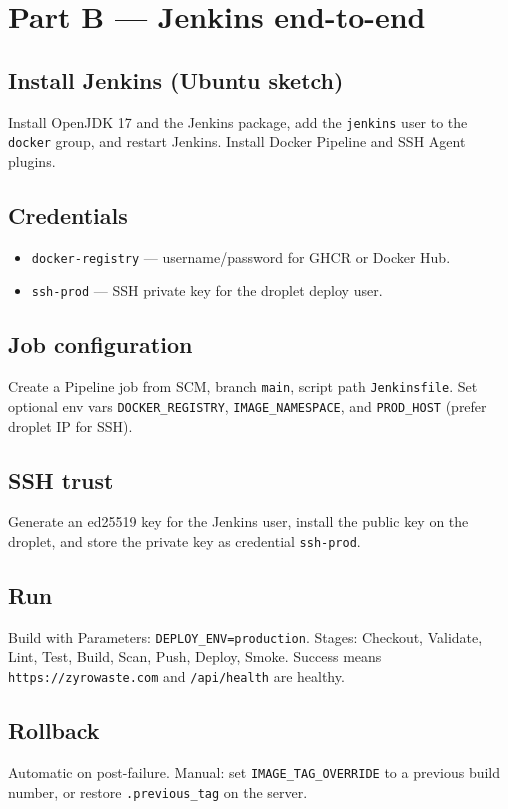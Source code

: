 \documentclass[12pt,a4paper]{article}
\begin{document}
\section{Part B --- Jenkins end-to-end}

\subsection*{Install Jenkins (Ubuntu sketch)}
Install OpenJDK 17 and the Jenkins package, add the \texttt{jenkins} user to the \texttt{docker} group, and restart Jenkins. Install Docker Pipeline and SSH Agent plugins.

\subsection*{Credentials}
\begin{itemize}
  \item \texttt{docker-registry} --- username/password for GHCR or Docker Hub.
  \item \texttt{ssh-prod} --- SSH private key for the droplet deploy user.
\end{itemize}

\subsection*{Job configuration}
Create a Pipeline job from SCM, branch \texttt{main}, script path \texttt{Jenkinsfile}. Set optional env vars \texttt{DOCKER\_REGISTRY}, \texttt{IMAGE\_NAMESPACE}, and \texttt{PROD\_HOST} (prefer droplet IP for SSH).

\subsection*{SSH trust}
Generate an ed25519 key for the Jenkins user, install the public key on the droplet, and store the private key as credential \texttt{ssh-prod}.

\subsection*{Run}
Build with Parameters: \texttt{DEPLOY\_ENV=production}. Stages: Checkout, Validate, Lint, Test, Build, Scan, Push, Deploy, Smoke. Success means \texttt{https://zyrowaste.com} and \texttt{/api/health} are healthy.

\subsection*{Rollback}
Automatic on post-failure. Manual: set \texttt{IMAGE\_TAG\_OVERRIDE} to a previous build number, or restore \texttt{.previous\_tag} on the server.
\end{document}

